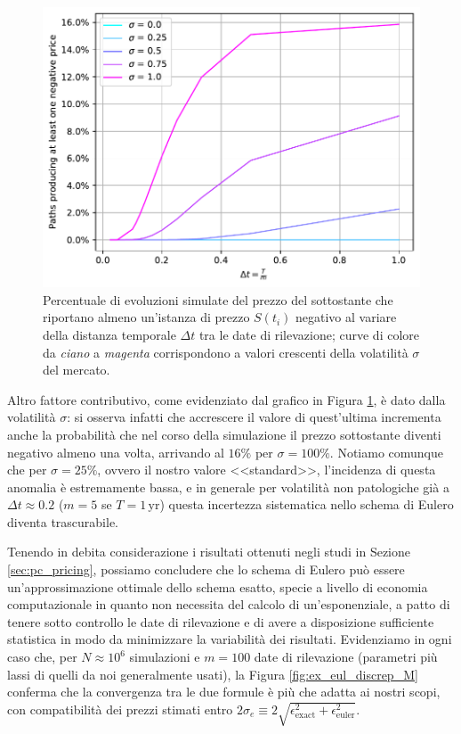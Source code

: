 \begin{figure}[t] 
    \centering
    \includegraphics[scale=0.5]{graphs/NegativePrices_PercentageVsM_VariousSigmas.pdf}
    \caption{Percentuale di evoluzioni simulate del prezzo del sottostante che riportano almeno un'istanza di prezzo $S(t_i)$ negativo al variare della distanza temporale $\Delta t$ tra le date di rilevazione; curve di colore da \textit{ciano} a \textit{magenta} corrispondono a valori crescenti della volatilità $\sigma$ del mercato.}
    \label{fig:negativeprices}
\end{figure}

Altro fattore contributivo, come evidenziato dal grafico in Figura \ref{fig:negativeprices}, è dato dalla volatilità $\sigma$: si osserva infatti che accrescere il valore di quest'ultima incrementa anche la probabilità che nel corso della simulazione il prezzo sottostante diventi negativo almeno una volta, arrivando al $16\%$ per $\sigma=100\%$. Notiamo comunque che per $\sigma=25\%$, ovvero il nostro valore <<standard>>, l'incidenza di questa anomalia è estremamente bassa, e in generale per volatilità non patologiche già a $\Delta t \approx 0.2$ ($m=5$ se $T=1 \, \text{yr}$) questa incertezza sistematica nello schema di Eulero diventa trascurabile.

Tenendo in debita considerazione i risultati ottenuti negli studi in Sezione \ref{sec:pc_pricing}, possiamo concludere che lo schema di Eulero può essere un'approssimazione ottimale dello schema esatto, specie a livello di economia computazionale in quanto non necessita del calcolo di un'esponenziale, a patto di tenere sotto controllo le date di rilevazione e di avere a disposizione sufficiente statistica in modo da minimizzare la variabilità dei risultati. Evidenziamo in ogni caso che, per $N\approx 10^6$ simulazioni e $m = 100$ date di rilevazione (parametri più lassi di quelli da noi generalmente usati), la Figura \ref{fig:ex_eul_discrep_M} conferma che la convergenza tra le due formule è più che adatta ai nostri scopi, con compatibilità dei prezzi stimati entro $2\sigma_e \equiv 2\sqrt{\epsilon_\text{exact}^2 + \epsilon_\text{euler}^2}$.